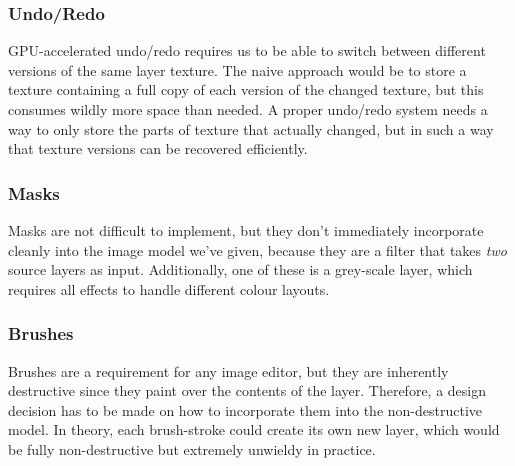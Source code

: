 \documentclass[12pt]{article}
\begin{document}
\subsubsection{Undo/Redo}

GPU-accelerated undo/redo requires us to be able to switch between different versions of the same
layer texture.  The naive approach would be to store a texture containing a full copy of each
version of the changed texture, but this consumes wildly more space than needed.  A proper undo/redo
system needs a way to only store the parts of texture that actually changed, but in such a way that
texture versions can be recovered efficiently.

\subsubsection{Masks}

Masks are not difficult to implement, but they don't immediately incorporate cleanly into the image
model we've given, because they are a filter that takes \emph{two} source layers as input.
Additionally, one of these is a grey-scale layer, which requires all effects to handle different
colour layouts.

\subsubsection{Brushes}

Brushes are a requirement for any image editor, but they are inherently destructive since they
paint over the contents of the layer.  Therefore, a design decision has to be made on how to
incorporate them into the non-destructive model.  In theory, each brush-stroke could create its own
new layer, which would be fully non-destructive but extremely unwieldy in practice.



\pagebreak
\end{document}
